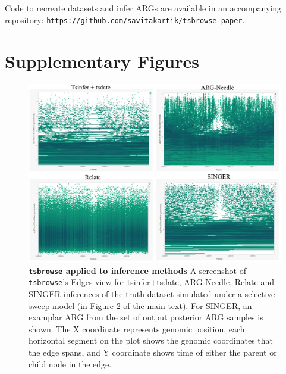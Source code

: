 \documentclass[unnumsec,webpdf,contemporary,large,namedate]{oup-authoring-template}%
\begin{document}

\subsection{} Code to recreate datasets and infer ARGs are available in an
accompanying repository:
\texttt{\url{https://github.com/savitakartik/tsbrowse-paper}}.

\clearpage
\section{Supplementary Figures}
\begin{figure}
    \centering
    \includegraphics[width=0.95\linewidth]{figures/SuppFig1.png}
    \caption{\textbf{\texttt{tsbrowse} applied to inference methods}
    A screenshot of \texttt{tsbrowse}'s Edges view for tsinfer+tsdate,
ARG-Needle, Relate and SINGER inferences of the truth dataset
simulated under a selective sweep model (in Figure 2 of the main text). For
SINGER, an examplar ARG from the set of output posterior ARG samples is shown.
The X coordinate represents genomic position, each horizontal segment on the
plot shows the genomic coordinates that the edge spans, and Y coordinate shows
time of either the parent or child node in the edge.}
    \label{fig:Supplementary_Figure_1}
\end{figure}
\end{document}
